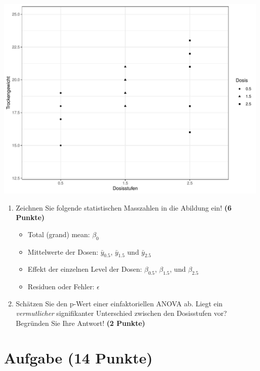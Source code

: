 \documentclass[a4paper, 10pt]{scrartcl}\usepackage[]{graphicx}\usepackage[]{color}
\makeatletter
\def\maxwidth{ %
  \ifdim\Gin@nat@width>\linewidth
    \linewidth
  \else
    \Gin@nat@width
  \fi
}
\newenvironment{knitrout}{}{} %
\makeatother
\begin{document}
\begin{knitrout}
\color{fgcolor}

{\centering \includegraphics[width=\maxwidth]{img/anova-01-a-1} 

}


\end{knitrout}

\begin{enumerate}
\item Zeichnen Sie folgende statistischen Masszahlen in die Abildung ein! \textbf{(6 Punkte)}
  \begin{itemize}
  \item Total (grand) mean: $\beta_0$
  \item Mittelwerte der Dosen: $\bar{y}_{0.5}$, $\bar{y}_{1.5}$ und $\bar{y}_{2.5}$
  \item Effekt der einzelnen Level der Dosen: $\beta_{0.5}$, $\beta_{1.5}$,
    und $\beta_{2.5}$
  \item Residuen oder Fehler: $\epsilon$
  \end{itemize}
\item Sch{\"a}tzen Sie den p-Wert einer einfaktoriellen ANOVA ab. Liegt ein
  \textit{vermutlicher} signifikanter Unterschied zwischen den Dosisstufen
  vor? Begr{\"u}nden Sie Ihre Antwort! \textbf{(2 Punkte)}
\end{enumerate}
 
\clearpage

\section{Aufgabe \hfill (14 Punkte)}
\end{document}
